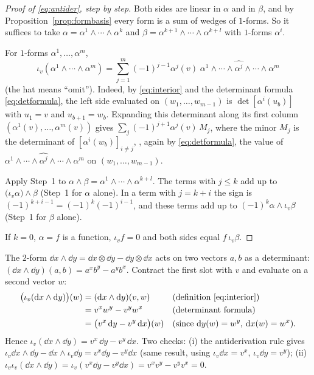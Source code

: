 \begin{proof}[Proof of \eqref{eq:antider}, step by step]
Both sides are linear in $\alpha$ and in $\beta$, and by Proposition~\ref{prop:formbasis} every form is a sum of wedges of $1$-forms.
So it suffices to take $\alpha=\alpha^1\wedge\cdots\wedge\alpha^k$ and $\beta=\alpha^{k+1}\wedge\cdots\wedge\alpha^{k+l}$ with $1$-forms $\alpha^i$.

 For $1$-forms $\alpha^1,\dots,\alpha^m$,
\[
\iota_v(\alpha^1\wedge\cdots\wedge\alpha^m)=\sum_{j=1}^m(-1)^{j-1}\alpha^j(v)\;\alpha^1\wedge\cdots\wedge\widehat{\alpha^j}\wedge\cdots\wedge\alpha^m
\]
(the hat means ``omit''). Indeed, by \eqref{eq:interior} and the determinant formula \eqref{eq:detformula}, the left side evaluated on
$(w_1,\dots,w_{m-1})$ is $\det[\alpha^i(u_b)]$ with $u_1=v$ and $u_{b+1}=w_b$. Expanding this determinant along its first column
$(\alpha^1(v),\dots,\alpha^m(v))$ gives $\sum_j(-1)^{j+1}\alpha^j(v)\,M_j$, where the minor $M_j$ is the determinant of $[\alpha^i(w_b)]_{i\neq j}$,
\ie, again by \eqref{eq:detformula}, the value of $\alpha^1\wedge\cdots\wedge\widehat{\alpha^j}\wedge\cdots\wedge\alpha^m$ on $(w_1,\dots,w_{m-1})$.

 Apply Step~1 to $\alpha\wedge\beta=\alpha^1\wedge\cdots\wedge\alpha^{k+l}$. The terms with $j\le k$ add up to
$\bigl(\iota_v\alpha\bigr)\wedge\beta$ (Step~1 for $\alpha$ alone). In a term with $j=k+i$ the sign is
$(-1)^{k+i-1}=(-1)^k(-1)^{i-1}$, and these terms add up to $(-1)^k\alpha\wedge\iota_v\beta$ (Step~1 for $\beta$ alone).

 If $k=0$, $\alpha=f$ is a function, $\iota_vf=0$ and both sides equal $f\,\iota_v\beta$.
\end{proof}

\begin{example}\label{ex:interiorplane}
The $2$-form $\dd x\wedge\dd y=\dd x\otimes\dd y-\dd y\otimes\dd x$ acts on two vectors $a,b$ as a determinant:
$(\dd x\wedge\dd y)(a,b)=a^xb^y-a^yb^x$. Contract the first slot with $v$ and evaluate on a second vector $w$:
\begin{align*}
\bigl(\iota_v(\mathrm{d} x\wedge\mathrm{d} y)\bigr)(w)&=(\mathrm{d} x\wedge\mathrm{d} y)(v,w) &&\text{(definition \eqref{eq:interior})}\\
&=v^xw^y-v^yw^x &&\text{(determinant formula)}\\
&=\bigl(v^x\,\mathrm{d} y-v^y\,\mathrm{d} x\bigr)(w) &&\text{(since $\mathrm{d} y(w)=w^y$, $\mathrm{d} x(w)=w^x$).}
\end{align*}
Hence $\iota_v(\dd x\wedge\dd y)=v^x\,\dd y-v^y\,\dd x$. Two checks: (i) the antiderivation rule gives $\iota_v\dd x\wedge\dd y-\dd x\wedge\iota_v\dd y=v^x\dd y-v^y\dd x$ (same result, using $\iota_v\dd x=v^x$, $\iota_v\dd y=v^y$);
(ii) $\iota_v\iota_v(\dd x\wedge\dd y)=\iota_v(v^x\dd y-v^y\dd x)=v^xv^y-v^yv^x=0$.
\end{example}

